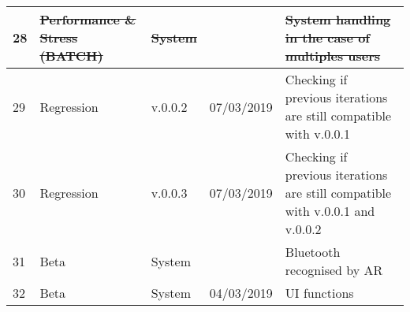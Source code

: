 \begin{turn}{-0}
\begin{tabular}{ | l | l | l | l | l |}
	28 & \sout{Performance \& Stress (BATCH)} & \sout{System} &  & \sout{System handling in the case of multiples users}\\ \hline
	
	29 & Regression & v.0.0.2 &07/03/2019& Checking if previous iterations are still compatible with v.0.0.1\\ \hline
	
	30 & Regression & v.0.0.3 & 07/03/2019& Checking if previous iterations are still compatible with v.0.0.1 and v.0.0.2\\ \hline
	
	31 & Beta & System &  & Bluetooth recognised by AR \\ \hline
	
	32 & Beta & System & 04/03/2019 & UI functions\\ \hline
	
\end{tabular}
\end{turn}


